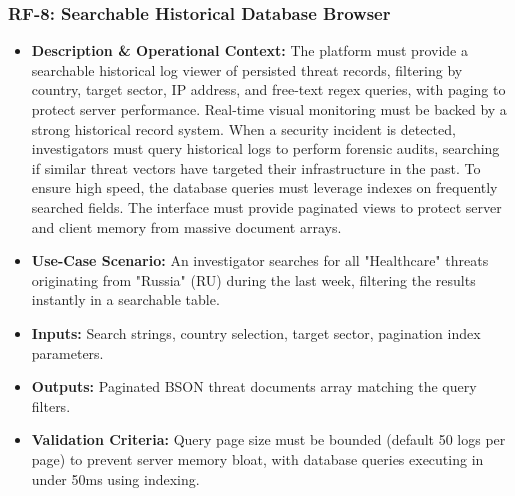 \subsubsection{RF-8: Searchable Historical Database Browser}
\begin{itemize}
    \item \textbf{Description \& Operational Context:} The platform must provide a searchable historical log viewer of persisted threat records, filtering by country, target sector, IP address, and free-text regex queries, with paging to protect server performance. Real-time visual monitoring must be backed by a strong historical record system. When a security incident is detected, investigators must query historical logs to perform forensic audits, searching if similar threat vectors have targeted their infrastructure in the past. To ensure high speed, the database queries must leverage indexes on frequently searched fields. The interface must provide paginated views to protect server and client memory from massive document arrays.
    \item \textbf{Use-Case Scenario:} An investigator searches for all "Healthcare" threats originating from "Russia" (RU) during the last week, filtering the results instantly in a searchable table.
    \item \textbf{Inputs:} Search strings, country selection, target sector, pagination index parameters.
    \item \textbf{Outputs:} Paginated BSON threat documents array matching the query filters.
    \item \textbf{Validation Criteria:} Query page size must be bounded (default 50 logs per page) to prevent server memory bloat, with database queries executing in under 50ms using indexing.
\end{itemize}

